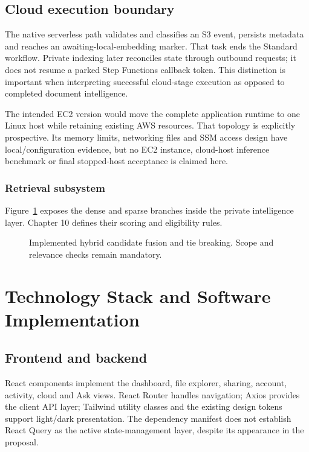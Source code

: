 \documentclass[11pt,a4paper,oneside]{report}
\newcommand{\ShortCaption}[1]{\csname ShortCaption#1\endcsname}
\newcommand{\diagram}[3]{\par\begin{figure}[htbp]\centering\sbox{\DiagramBox}{}\ifdim\wd\DiagramBox>\linewidth\resizebox{\linewidth}{!}{\usebox{\DiagramBox}}\else\usebox{\DiagramBox}\fi\caption[\ShortCaption{#1}]{#2}\label{fig:#3}\end{figure}\par}
\begin{document}
\section{Cloud execution boundary}
The native serverless path validates and classifies an S3 event, persists metadata and reaches an awaiting-local-embedding marker. That task ends the Standard workflow. Private indexing later reconciles state through outbound requests; it does not resume a parked Step Functions callback token. This distinction is important when interpreting successful cloud-stage execution as opposed to completed document intelligence.

The intended EC2 version would move the complete application runtime to one Linux host while retaining existing AWS resources. That topology is explicitly prospective. Its memory limits, networking files and SSM access design have local/configuration evidence, but no EC2 instance, cloud-host inference benchmark or final stopped-host acceptance is claimed here.
\subsection{Retrieval subsystem}
Figure~\ref{fig:hybrid} exposes the dense and sparse branches inside the private intelligence layer. Chapter 10 defines their scoring and eligibility rules.
\diagram{hybrid}{Implemented hybrid candidate fusion and tie breaking. Scope and relevance checks remain mandatory.}{hybrid}
\FloatBarrier

\chapter{Technology Stack and Software Implementation}
\section{Frontend and backend}
React components implement the dashboard, file explorer, sharing, account, activity, cloud and Ask views. React Router handles navigation; Axios provides the client API layer; Tailwind utility classes and the existing design tokens support light/dark presentation. The dependency manifest does not establish React Query as the active state-management layer, despite its appearance in the proposal.
\end{document}
